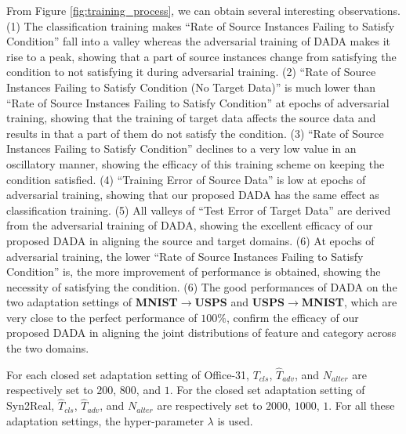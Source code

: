 \documentclass[letterpaper]{article} \usepackage{aaai20}  \usepackage{times}  \usepackage{helvet} \usepackage{courier}  \usepackage[hyphens]{url}  \usepackage{graphicx} \urlstyle{rm} \def\UrlFont{\rm}  \usepackage{graphicx}  \frenchspacing  \setlength{\pdfpagewidth}{8.5in}  \setlength{\pdfpageheight}{11in}
\begin{document}
From Figure \ref{fig:training_process}, we can obtain several interesting observations. (1) The classification training makes ``Rate of Source Instances Failing to Satisfy Condition'' fall into a valley whereas the adversarial training of DADA makes it rise to a peak, showing that a part of source instances change from satisfying the condition to not satisfying it during adversarial training. (2)  ``Rate of Source Instances Failing to Satisfy Condition (No Target Data)'' is much lower than ``Rate of Source Instances Failing to Satisfy Condition'' at epochs of adversarial training, showing that the training of target data affects the source data and results in that a part of them do not satisfy the condition. (3) ``Rate of Source Instances Failing to Satisfy Condition'' declines to a very low value in an oscillatory manner, showing the efficacy of this training scheme on keeping the condition satisfied. (4) ``Training Error of Source Data'' is low at epochs of adversarial training, showing that our proposed DADA has the same effect as classification training. (5) All valleys of ``Test Error of Target Data'' are derived from the adversarial training of DADA, showing the excellent efficacy of our proposed DADA in aligning the source and target domains. (6) At epochs of adversarial training, the lower ``Rate of Source Instances Failing to Satisfy Condition'' is, the more improvement of performance is obtained, showing the necessity of satisfying the condition. (6) The good performances of DADA on the two adaptation settings of \textbf{MNIST}$\rightarrow$\textbf{USPS} and \textbf{USPS}$\rightarrow$\textbf{MNIST}, which are very close to the perfect performance of $100\%$, confirm the efficacy of our proposed DADA in aligning the joint distributions of feature and category across the two domains.

For each closed set adaptation setting of Office-31, $T_{cls}$, ${\hat{T}}_{adv}$, and $N_{alter}$ are respectively set to $200$, $800$, and $1$. For the closed set adaptation setting of Syn2Real, ${\hat{T}}_{cls}$, ${\hat{T}}_{adv}$, and $N_{alter}$ are respectively set to $2000$, $1000$, $1$. For all these adaptation settings, the hyper-parameter $\lambda$ is used. 
\end{document}
